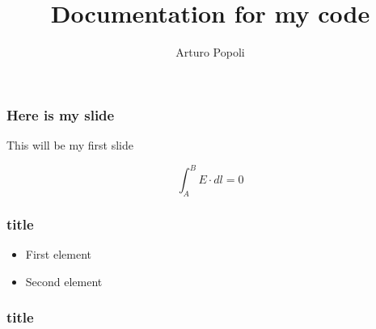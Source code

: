 \documentclass{beamer}
\title{Documentation for my code}
\author{Arturo Popoli}
\begin{document}
	
\maketitle

\begin{frame}
	\frametitle{Here is my slide}
	
	This will be my first slide
	
	\begin{equation}
		\int_{A}^{B} E \cdot dl = 0
	\end{equation}
\end{frame}

\begin{frame}
	\frametitle{title}
\begin{itemize}
	\item<+-> First element
	\item<+-> Second element
\end{itemize}
\end{frame}

\begin{frame}
	\frametitle{title}
	
\end{frame}
\end{document}
